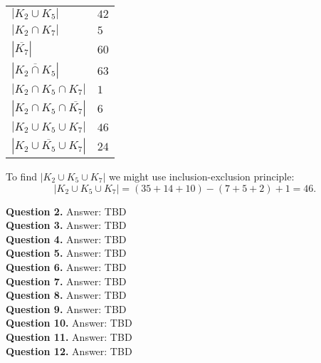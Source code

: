 \documentclass[jou]{apa6}
\begin{document}
\begin{tabular}{ll} 
$\left| K_2 \cup K_5 \right|$ & $42$ \\ 
$\left| K_2 \cap K_7 \right|$ & $5$ \\ 
$\left| \overline{K_7} \right|$ & $60$ \\
$\left| \overline{K_2 \cap K_5} \right|$ & $63$ \\
$\left| K_2 \cap K_5 \cap K_7 \right|$ & $1$ \\ 
$\left| K_2 \cap K_5 \cap \overline{K_7} \right|$ & $6$ \\ 
$\left| K_2 \cup K_5 \cup K_7 \right|$ & $46$ \\ 
$\left| \overline{K_2 \cup K_5 \cup K_7} \right|$ & $24$ \\ 
\end{tabular}

To find $\left| K_2 \cup K_5 \cup K_7 \right|$ we might use inclusion-exclusion principle: 
$$\left| K_2 \cup K_5 \cup K_7 \right| = (35 + 14 + 10) - (7 + 5 + 2) + 1 = 46.$$


\vspace{6pt}
{\bf Question 2.} Answer: TBD\\

\vspace{6pt}
{\bf Question 3.} Answer: TBD\\

\vspace{6pt}
{\bf Question 4.} Answer: TBD\\

\vspace{6pt}
{\bf Question 5.} Answer: TBD\\

\vspace{6pt}
{\bf Question 6.} Answer: TBD\\

\vspace{6pt}
{\bf Question 7.} Answer: TBD\\

\vspace{6pt}
{\bf Question 8.} Answer: TBD\\

\vspace{6pt}
{\bf Question 9.} Answer: TBD\\

\vspace{6pt}
{\bf Question 10.} Answer: TBD\\

\vspace{6pt}
{\bf Question 11.} Answer: TBD\\


\vspace{6pt}
{\bf Question 12.} Answer: TBD\\
\end{document}
